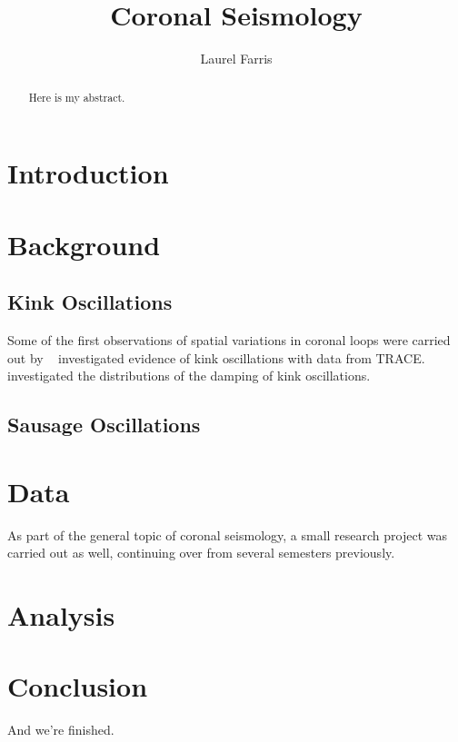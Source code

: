 \documentclass[preprint2]{aastex}
\begin{document}
\title{Coronal Seismology}
\author{Laurel Farris}

\begin{abstract}
Here is my abstract.
\end{abstract}

\section{Introduction}

\section{Background}

\subsection{Kink Oscillations}
Some of the first observations of spatial variations in coronal
loops were carried out by
~\cite{kink_1} investigated evidence of kink oscillations
with data from TRACE.
~\cite{kink_2} investigated the distributions of the damping
of kink oscillations.

\subsection{Sausage Oscillations}


\section{Data}
As part of the general topic of coronal seismology,
a small research project was carried out as well, continuing
over from several semesters previously.

\section{Analysis}

\section{Conclusion}
And we're finished.


\end{document}
